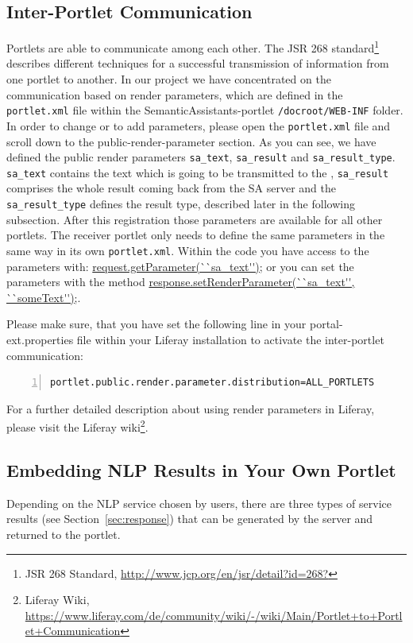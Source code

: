 \subsection{Inter-Portlet Communication}
Portlets are able to communicate among each other. The JSR 268 standard\footnote{JSR 268 Standard, \url{http://www.jcp.org/en/jsr/detail?id=268?}} describes different techniques for a successful transmission of information from one portlet to another. In our project we have concentrated on the communication based on render parameters, which are defined in the \texttt{portlet.xml} file within the SemanticAssistants-portlet \texttt{/docroot/WEB-INF} folder. In order to change or to add parameters, please open the \texttt{portlet.xml} file and scroll down to the public-render-parameter section. As you can see, we have defined the public render parameters \texttt{sa\_text}, \texttt{sa\_result} and \texttt{sa\_result\_type}. \texttt{sa\_text} contains the text which is going to be transmitted to the \sa, \texttt{sa\_result} comprises the whole result coming back from the SA server and the \texttt{sa\_result\_type} defines the result type, described later in the following subsection. After this registration those parameters are available for all other portlets. The receiver portlet only needs to define the same parameters in the same way in its own \texttt{portlet.xml}. Within the code you have access to the parameters with: \url{request.getParameter(``sa\_text'');} or you can set the parameters with the method \url{response.setRenderParameter(``sa\_text'', ``someText'');}.

Please make sure, that you have set the following line in your portal-ext.properties file within your Liferay installation to activate the inter-portlet communication:

\begin{lstlisting}[language=XML,numbers=left,xleftmargin=4mm,columns=flexible]
portlet.public.render.parameter.distribution=ALL_PORTLETS
\end{lstlisting}

For a further detailed description about using render parameters in Liferay, please visit the Liferay wiki\footnote{Liferay Wiki, \url{https://www.liferay.com/de/community/wiki/-/wiki/Main/Portlet+to+Portlet+Communication}}. 

\subsection{Embedding NLP Results in Your Own Portlet}
Depending on the NLP service chosen by users, there are three types of service results  (see Section~\ref{sec:response}) that can be generated by the \sa server and returned to the portlet.

